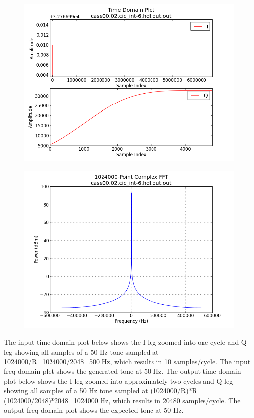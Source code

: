 \documentclass{article}
\begin{document}
	\begin{figure}[ht]
		\centering
		\begin{minipage}{.5\textwidth}
			\centering\includegraphics[width=1.0\linewidth]{output_time_DC}
			\label{fig:output_time_DC}
		\end{minipage}%
		\begin{minipage}{.5\textwidth}
			\centering\includegraphics[width=1.0\linewidth]{output_freq_DC}
			\label{fig:output_freq_DC}
		\end{minipage}
	\end{figure}

\newpage
The input time-domain plot below shows the I-leg zoomed into one cycle and Q-leg showing all samples of a 50 Hz tone sampled at 1024000/R=1024000/2048=500 Hz, which results in 10 samples/cycle. The input freq-domain plot shows the generated tone at 50 Hz.
The output time-domain plot below shows the I-leg zoomed into approximately two cycles and Q-leg showing all samples of a 50 Hz tone sampled at (1024000/R)*R=(1024000/2048)*2048=1024000 Hz, which results in 20480 samples/cycle. The output freq-domain plot shows the expected tone at 50 Hz.
\end{document}
